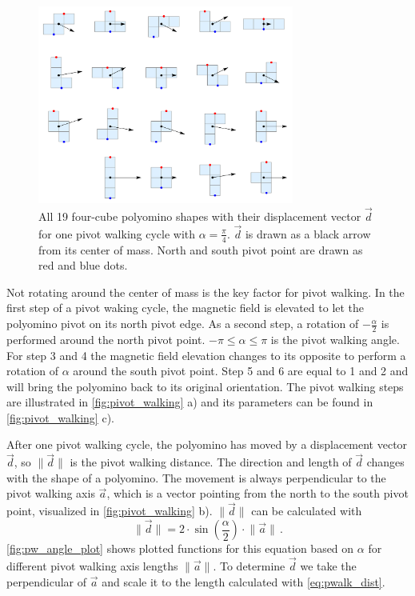 \begin{figure}
	\centering
	\includegraphics[width=0.75\textwidth]{figures/displacement_pivot_walking.pdf}
	\caption[Polyomino shapes with different displacement vectors]{All 19 four-cube polyomino shapes with their displacement vector $\vec{d}$ for one pivot walking cycle with $\alpha = \frac{\pi}{4}$. $\vec{d}$ is drawn as a black arrow from its center of mass. North and south pivot point are drawn as red and blue dots.}
	\label{fig:displacement_pivot_walking}
\end{figure}

Not rotating around the center of mass is the key factor for pivot walking.
In the first step of a pivot waking cycle, the magnetic field is elevated to let the polyomino pivot on its north pivot edge.
As a second step, a rotation of $-\frac{\alpha}{2}$ is performed around the north pivot point.
$-\pi \leq \alpha \leq \pi$ is the pivot walking angle.
For step 3 and 4 the magnetic field elevation changes to its opposite to perform a rotation of $\alpha$ around the south pivot point.
Step 5 and 6 are equal to 1 and 2 and will bring the polyomino back to its original orientation.
The pivot walking steps are illustrated in \autoref{fig:pivot_walking} a) and its parameters can be found in \autoref{fig:pivot_walking} c).

After one pivot walking cycle, the polyomino has moved by a displacement vector $\vec{d}$, so $\lVert \vec{d} \rVert$ is the pivot walking distance.
The direction and length of $\vec{d}$ changes with the shape of a polyomino.
The movement is always perpendicular to the pivot walking axis $\vec{a}$, which is a vector pointing from the north to  the south pivot point, visualized in \autoref{fig:pivot_walking} b).
$\lVert \vec{d} \rVert$ can be calculated with
\begin{equation}\label{eq:pwalk_dist}
\lVert \vec{d} \rVert = 2 \cdot \sin\left(\frac{\alpha}{2} \right) \cdot \lVert \vec{a} \rVert \,.
\end{equation}
\autoref{fig:pw_angle_plot} shows plotted functions for this equation based on $\alpha$ for different pivot walking axis lengths $\lVert \vec{a} \rVert$.
To determine $\vec{d}$ we take the perpendicular of $\vec{a}$ and scale it to the length calculated with \autoref{eq:pwalk_dist}.

